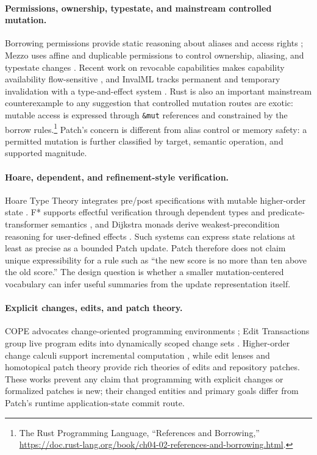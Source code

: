 \paragraph{Permissions, ownership, typestate, and mainstream controlled mutation.}
Borrowing permissions provide static reasoning about aliases and access rights \cite{naden2012borrowing}; Mezzo uses affine and duplicable permissions to control ownership, aliasing, and typestate changes \cite{pottier2013mezzo}. Recent work on revocable capabilities makes capability availability flow-sensitive \cite{jia2026revocable}, and InvalML tracks permanent and temporary invalidation with a type-and-effect system \cite{gao2025invalidation}. Rust is also an important mainstream counterexample to any suggestion that controlled mutation routes are exotic: mutable access is expressed through \texttt{\&mut} references and constrained by the borrow rules.\footnote{The Rust Programming Language, ``References and Borrowing,'' \url{https://doc.rust-lang.org/book/ch04-02-references-and-borrowing.html}.} Patch's concern is different from alias control or memory safety: a permitted mutation is further classified by target, semantic operation, and supported magnitude.

\paragraph{Hoare, dependent, and refinement-style verification.}
Hoare Type Theory integrates pre/post specifications with mutable higher-order state \cite{nanevski2008htt}. F* supports effectful verification through dependent types and predicate-transformer semantics \cite{swamy2016fstar}, and Dijkstra monads derive weakest-precondition reasoning for user-defined effects \cite{ahman2017dijkstra}. Such systems can express state relations at least as precise as a bounded Patch update. Patch therefore does not claim unique expressibility for a rule such as ``the new score is no more than ten above the old score.'' The design question is whether a smaller mutation-centered vocabulary can infer useful summaries from the update representation itself.

\paragraph{Explicit changes, edits, and patch theory.}
COPE advocates change-oriented programming environments \cite{dig2016cope}; Edit Transactions group live program edits into dynamically scoped change sets \cite{mattis2017edittransactions}. Higher-order change calculi support incremental computation \cite{cai2014changes}, while edit lenses \cite{hofmann2012edit} and homotopical patch theory \cite{anguilhomotopical2016} provide rich theories of edits and repository patches. These works prevent any claim that programming with explicit changes or formalized patches is new; their changed entities and primary goals differ from Patch's runtime application-state commit route.

